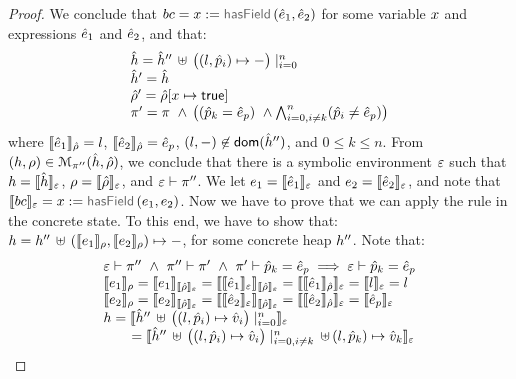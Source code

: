 \begin{proof}
\noindent{}
We conclude that  $\bcmd = \jvar := \hasfield(\sexpr_1, \sexpr_2)$ for some variable $\jvar$ and expressions $\sexpr_1$ and $\sexpr_2$, and that: 
$$
\begin{array}{l}
  \sheap =   \sheap'' \, \uplus \, \big((l, \sexprp_i) \mapsto -\big)\mid_{i = 0}^n     \\
  \sheap' =  \sheap \\
  \sstore' = \sstore[\jvar \mapsto \jtrue] \\ 
    \pc' = \pc \ \wedge \, \big( (\sexprp_k = \sexpr_p) \ \wedge \bigwedge_{i = 0, i \neq k}^n (\sexprp_i \neq \sexpr_p) \big)
\end{array}
$$ 
where $\symbeval{\sexpr_1}{\sstore} =  \loc$, $\symbeval{\sexpr_2}{\sstore} =  \sexpr_p$, 
$(\loc, -) \not\in \domain(\sheap'')$, and $0 \leq k \leq n$. 
%
From $(\heap, \store) \in \smodels{\sheap, \sstore}{\pc''}$, we conclude that there is a symbolic environment
$\senv$ such that $\heap = \semexpr{\sheap}{\senv}$, $\store = \semexpr{\sstore}{\senv}$, and 
$\senv \vdash \pc''$. 
We let $\jsilexpr_1 = \symbeval{\sexpr_1}{\senv}$ and  
$\jsilexpr_2 = \symbeval{\sexpr_2}{\senv}$, and note that $\symbeval{\bcmd}{\senv} = \jvar := \hasfield(\jsilexpr_1, \jsilexpr_2)$.
Now we have to prove that we can apply the  rule in the concrete state.
To this end, we have to show that:
$\heap = \heap'' \dunion (\symbeval{\jsilexpr_1}{\store}, \symbeval{\jsilexpr_2}{\store}) \mapsto -$, for 
some concrete heap $\heap''$. 
Note that: 
$$
\begin{array}{l}
%
\senv \vdash \pc'' \ \wedge \ \pc'' \vdash \pc' \ \wedge \ \pc' \vdash \sexprp_k = \sexpr_p \implies \senv \vdash \sexprp_k = \sexpr_p \\
%
 \symbeval{\jsilexpr_1}{\store} = \symbeval{\jsilexpr_1}{\symbeval{\sstore}{\senv}} = \symbeval{\symbeval{\sexpr_1}{\senv}}{\symbeval{\sstore}{\senv}} = \symbeval{\symbeval{\sexpr_1}{\sstore}}{\senv} 
    = \symbeval{\loc}{\senv} = \loc \\ 
  \symbeval{\jsilexpr_2}{\store}  = \symbeval{\jsilexpr_2}{\semexpr{\sstore}{\senv}} =  \symbeval{\symbeval{\sexpr_2}{\senv}}{\symbeval{\sstore}{\senv}} = \symbeval{\symbeval{\sexpr_2}{\sstore}}{\senv}
   =  \symbeval{\sexpr_p}{\senv} \\
 \heap = \semexpr{\sheap'' \, \uplus \, \big((l, \sexprp_i) \mapsto \sexprv_i\big)\mid_{i = 0}^n}{\senv} \\
    \qquad = \semexpr{\sheap'' \, \uplus \, \big((l, \sexprp_i) \mapsto \sexprv_i\big)\mid_{i = 0, i\neq k}^n \dunion (l, \sexprp_k) \mapsto \sexprv_k}{\senv} \\

\end{array}$$
\end{proof}
